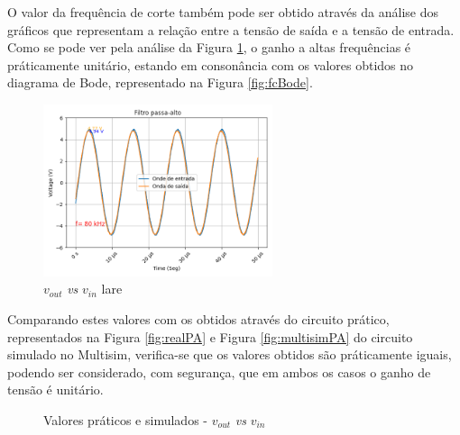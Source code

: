 O valor da frequência de corte também pode ser obtido através da análise dos gráficos que representam a relação entre a tensão de saída e a tensão de entrada. Como se pode ver pela análise da Figura \ref{fig:voutvinlare}, o ganho a altas frequências é práticamente unitário, estando em consonância com os valores obtidos no diagrama de Bode, representado na Figura \ref{fig:fcBode}. 

\begin{figure}[hbtp]
	\centering
	\includegraphics[width=0.6\textwidth]{figures/filtro_passa-alto.png}
	\caption{$v_{out}$ \textit{vs} $v_{in}$ \acrshort{lare}}
	\label{fig:voutvinlare}
\end{figure}

Comparando estes valores com os obtidos através do circuito prático, representados na Figura \ref{fig:realPA} e Figura \ref{fig:multisimPA} do circuito simulado no Multisim, verifica-se que os valores obtidos são práticamente iguais, podendo ser considerado, com segurança, que em ambos os casos o ganho de tensão é unitário. 

\begin{figure}[hbtp]
	\centering%
		\centering
		\qquad
		\caption{Valores práticos e simulados - $v_{out}$ \textit{vs} $v_{in}$}%
		\label{fig:simulacaoPA}%
	\end{figure}

